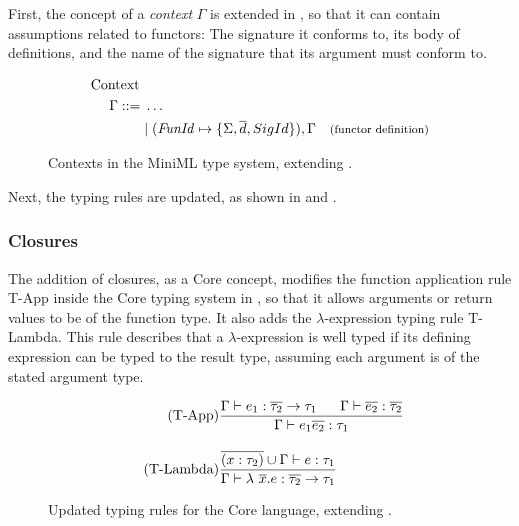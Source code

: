 First, the concept of a \emph{context} $\Gamma$ is extended in , so that it can contain assumptions related to functors: The signature it conforms to, its body of definitions, and the name of the signature that its argument must conform to.

\begin{figure}[!htb]
\begin{align*}
\begin{aligned}
\text{Context }\\
\Gamma ::=\; & \ldots \\ 
&| \; (\mathit{FunId} \mapsto \lbrace \Sigma, \overline{d}, SigId\rbrace), \Gamma
                                           & {\text{\footnotesize(functor definition)}}
\end{aligned}
\end{align*}
\caption[Updated Contexts]{Contexts in the MiniML type system, extending .}
\label{fig:UpdatedMiniMLContexts}
\end{figure}

Next, the typing rules are updated, as shown in  and .

\subsubsection{Closures}
The addition of closures, as a Core concept, modifies the function application rule T-App inside the Core typing system in , so that it allows arguments or return values to be of the function type.
It also adds the $\lambda$-expression typing rule T-Lambda. 
This rule describes that a $\lambda$-expression is well typed if its defining expression can be typed to the result type, assuming each argument is of the stated argument type.

\begin{figure}[htb]
\begin{align*}
\tag{T-App}
&\frac
{\Gamma \vdash e_{1}:\overline{\tau_{2}} \rightarrow \tau_{1}
    \;\;\;\;\;\;
    \Gamma \vdash \overline{e_{2}}:\overline{\tau_{2}}}
{\Gamma \vdash e_{1} \overline{e_{2}}:\tau_{1}}
\\[1em]
\tag{T-Lambda}
&\frac
{\overline{(x:\tau_{2})} \cup \Gamma \vdash e : \tau_{1}}
{\Gamma \vdash \lambda\ \overline{x}.e : \overline{\tau_{2}} \rightarrow \tau_{1}}
\end{align*}
\caption[Updated Typing Rules: Core Language]{Updated typing rules for the Core language, extending . \label{fig:UpdatedTypeRulesCore}}
\end{figure}

